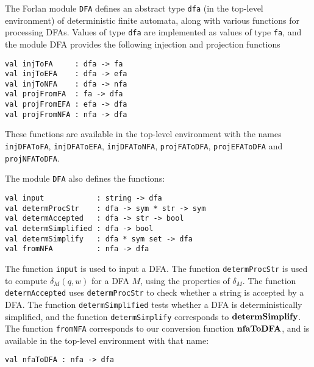 The Forlan module \texttt{DFA} defines an abstract type \texttt{dfa}
%
%
(in the top-level environment) of deterministic finite automata,
along with various functions for processing DFAs.
Values of type \texttt{dfa} are implemented as values of type \texttt{fa}, and
the module DFA provides the following injection and projection functions
\begin{verbatim}
val injToFA     : dfa -> fa
val injToEFA    : dfa -> efa
val injToNFA    : dfa -> nfa
val projFromFA  : fa -> dfa
val projFromEFA : efa -> dfa
val projFromNFA : nfa -> dfa
\end{verbatim}
%
%
%
%
%
%
These functions are available in the top-level environment with the
names \texttt{injDFAToFA}, \texttt{injDFAToEFA}, \texttt{injDFAToNFA},
\texttt{projFAToDFA}, \texttt{projEFAToDFA} and \texttt{projNFAToDFA}.
%
%
%
%
%
%

The module \texttt{DFA} also defines the functions:
\begin{verbatim}
val input            : string -> dfa
val determProcStr    : dfa -> sym * str -> sym
val determAccepted   : dfa -> str -> bool
val determSimplified : dfa -> bool
val determSimplify   : dfa * sym set -> dfa
val fromNFA          : nfa -> dfa
\end{verbatim}
%
%
%
%
%
%
The function \texttt{input} is used to input a DFA.  The function
\texttt{determProcStr} is used to compute $\delta_M(q,w)$ for a DFA
$M$, using the properties of $\delta_M$.  The function
\texttt{determAccepted} uses \texttt{determProcStr} to check whether a
string is accepted by a DFA.  The function \texttt{determSimplified}
tests whether a DFA is deterministically simplified, and
the function \texttt{determSimplify}
corresponds to $\mathbf{determSimplify}$.  The function \texttt{fromNFA}
corresponds to our conversion function $\mathbf{nfaToDFA}$, and is available
in the top-level environment with that name:
\begin{verbatim}
val nfaToDFA : nfa -> dfa
\end{verbatim}
%

